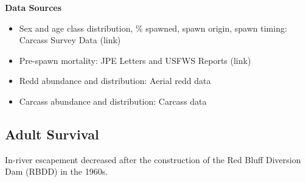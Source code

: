 \documentclass[
]{book}
\providecommand{\tightlist}{%
  \setlength{\itemsep}{0pt}\setlength{\parskip}{0pt}}
\theoremstyle{definition}
\theoremstyle{definition}
\theoremstyle{definition}
\theoremstyle{definition}
\theoremstyle{remark}
\begin{document}
\textbf{Data Sources}

\begin{itemize}
\tightlist
\item
  Sex and age class distribution, \% spawned, spawn origin, spawn timing: Carcass Survey Data (link)
\item
  Pre-spawn mortality: JPE Letters and USFWS Reports (link)
\item
  Redd abundance and distribution: Aerial redd data
\item
  Carcass abundance and distribution: Carcass data
\end{itemize}

\hypertarget{adult-survival}{%
\subsection{Adult Survival}\label{adult-survival}}

In-river escapement decreased after the construction of the Red Bluff Diversion Dam (RBDD) in the 1960s.
\end{document}
